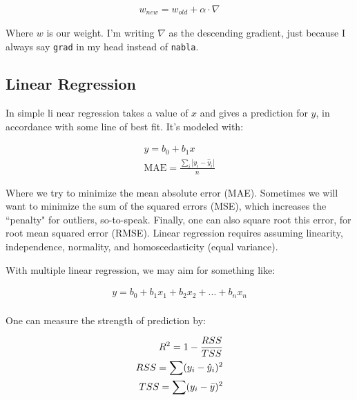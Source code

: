\begin{equation}
    \begin{split}
        w_{new} = w_{old} + \alpha \cdot \nabla
    \end{split}
\end{equation}

Where $w$ is our weight. I'm writing $\nabla$ as the descending gradient, just because I always say \texttt{grad} in my head instead of \texttt{nabla}.\newline


\subsection{Linear Regression}

In simple li near regression takes a value of $x$ and gives a prediction for $y$, in accordance with some line of best fit. It's modeled with:

\begin{equation}
\begin{split}
    y = b_0 + b_1x \\
    \mathrm{MAE} = \frac{\sum_i|y_i - \hat{y}_i|}{n}
\end{split}
\end{equation}

Where we try to minimize the mean absolute error (MAE). Sometimes we will want to minimize the sum of the squared errors (MSE), which increases the ``penalty" for outliers, so-to-speak. Finally, one can also square root this error, for root mean squared error (RMSE). Linear regression requires assuming linearity, independence, normality, and homoscedasticity (equal variance).\newline

With multiple linear regression, we may aim for something like: 

\begin{equation}
\begin{split}
    y = b_0 + b_1x_1 + b_2x_2 + ... + b_nx_n\\
\end{split}
\end{equation}

One can measure the strength of prediction by: 

\begin{equation}
\begin{split}
    R^2 = 1 - \frac{RSS}{TSS} \\
    RSS = \sum (y_i - \hat{y}_i)^2 \\
    TSS = \sum (y_i - \Bar{y})^2 \\
\end{split}
\end{equation}

